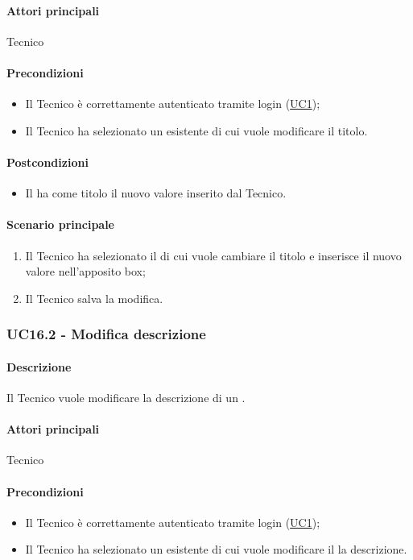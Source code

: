 \paragraph*{Attori principali} Tecnico
\paragraph*{Precondizioni}
\begin{itemize}
  \item Il Tecnico è correttamente autenticato tramite login (\hyperref[UC1]{UC1});
  \item Il Tecnico ha selezionato un  esistente di cui vuole modificare il titolo.  
\end{itemize}
\paragraph*{Postcondizioni}
\begin{itemize}
  \item Il  ha come titolo il nuovo valore inserito dal Tecnico.
\end{itemize}
\paragraph*{Scenario principale}
\begin{enumerate}
  \item Il Tecnico ha selezionato il  di cui vuole cambiare il titolo e inserisce il nuovo valore nell’apposito box;
  \item Il Tecnico salva la modifica.  
\end{enumerate}


\subsubsection{UC16.2 - Modifica descrizione }\label{UC16point2}
\paragraph*{Descrizione} Il Tecnico vuole modificare la descrizione di un .
\paragraph*{Attori principali} Tecnico
\paragraph*{Precondizioni}
\begin{itemize}
  \item Il Tecnico è correttamente autenticato tramite login (\hyperref[UC1]{UC1});
  \item Il Tecnico ha selezionato un  esistente di cui vuole modificare il la descrizione.  
\end{itemize}
